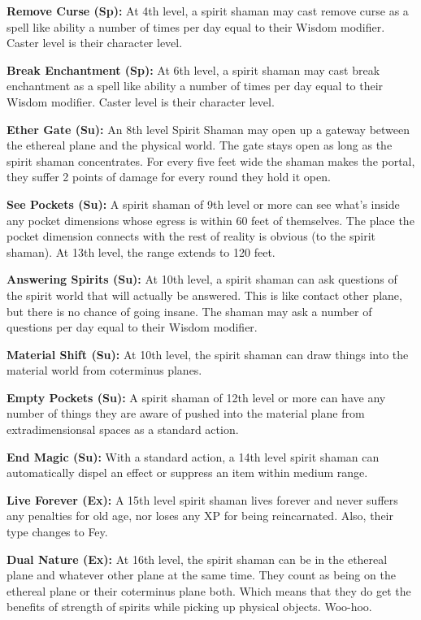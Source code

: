 \textbf{Remove Curse (Sp):} At 4th level, a spirit shaman may cast remove curse as a spell like ability a number of times per day equal to their Wisdom modifier. Caster level is their character level.

\textbf{Break Enchantment (Sp):} At 6th level, a spirit shaman may cast break enchantment as a spell like ability a number of times per day equal to their Wisdom modifier. Caster level is their character level.

\textbf{Ether Gate (Su):} An 8th level Spirit Shaman may open up a gateway between the ethereal plane and the physical world. The gate stays open as long as the spirit shaman concentrates. For every five feet wide the shaman makes the portal, they suffer 2 points of damage for every round they hold it open.

\textbf{See Pockets (Su):} A spirit shaman of 9th level or more can see what's inside any pocket dimensions whose egress is within 60 feet of themselves. The place the pocket dimension connects with the rest of reality is obvious (to the spirit shaman). At 13th level, the range extends to 120 feet.

\textbf{Answering Spirits (Su):} At 10th level, a spirit shaman can ask questions of the spirit world that will actually be answered. This is like contact other plane, but there is no chance of going insane. The shaman may ask a number of questions per day equal to their Wisdom modifier.

\textbf{Material Shift (Su):} At 10th level, the spirit shaman can draw things into the material world from coterminus planes.

\textbf{Empty Pockets (Su):} A spirit shaman of 12th level or more can have any number of things they are aware of pushed into the material plane from extradimensionsal spaces as a standard action.

\textbf{End Magic (Su):} With a standard action, a 14th level spirit shaman can automatically dispel an effect or suppress an item within medium range.

\textbf{Live Forever (Ex):} A 15th level spirit shaman lives forever and never suffers any penalties for old age, nor loses any XP for being reincarnated. Also, their type changes to Fey.

\textbf{Dual Nature (Ex):} At 16th level, the spirit shaman can be in the ethereal plane and whatever other plane at the same time. They count as being on the ethereal plane or their coterminus plane both. Which means that they do get the benefits of strength of spirits while picking up physical objects. Woo-hoo.

